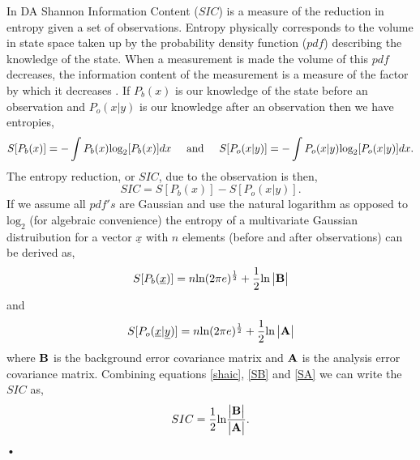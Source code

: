 \documentclass[11pt]{article}
\begin{document}
In DA Shannon Information Content ($SIC$) is a measure of the reduction in entropy given a set of observations. Entropy physically corresponds to the volume in state space taken up by the probability density function ($pdf$) describing the knowledge of the state. When a measurement is made the volume of this $pdf$ decreases, the information content of the measurement is a measure of the factor by which it decreases \cite{rodgers2000inverse}. If $P_b(x)$ is our knowledge of the state before an observation and $P_o(x|y)$ is our knowledge after an observation then we have entropies,
\[
S[P_b(x)] = - \int P_b(x)\text{log}_2[P_b(x)]dx
 \hspace{5mm} \text{and} \hspace{5mm} 
S[P_o(x|y)] = - \int P_o(x|y)\text{log}_2[P_o(x|y)]dx.
\]
The entropy reduction, or $SIC$, due to the observation is then,
\begin{equation} \label{shaic}
SIC =  S[P_b(x)]-S[P_o(x|y)].
\end{equation}
If we assume all $pdf's$ are Gaussian and use the natural logarithm as opposed to $\text{log}_2$ (for algebraic convenience) \cite{rodgers2000inverse} the entropy of a multivariate Gaussian distruibution for a vector $\underline{x}$ with $n$ elements (before and after observations) can be derived as,
\begin{equation} \label{SB}
 S[P_b(\underline{x})] = n\text{ln}(2\pi e)^{\frac{1}{2}}+\frac{1}{2}\text{ln}\begin{vmatrix}\bf{B}\end{vmatrix}
\end{equation}
and
\begin{equation} \label{SA}
 S[P_o(\underline{x}|\underline{y})] = n\text{ln}(2\pi e)^{\frac{1}{2}}+\frac{1}{2}\text{ln}\begin{vmatrix}\bf{A}\end{vmatrix}
\end{equation}
where $\bf{B}$ is the background error covariance matrix and $\bf{A}$ is the analysis error covariance matrix. Combining equations \ref{shaic}, \ref{SB} and \ref{SA} we can write the $SIC$ as,
\begin{equation}
SIC=\frac{1}{2}\text{ln}\frac{\begin{vmatrix} \bf{B} \end{vmatrix}}{\begin{vmatrix} \bf{A} \end{vmatrix}}.
\end{equation}•
\end{document}
